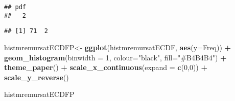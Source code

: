 \documentclass[
]{article}
\newenvironment{Shaded}{\begin{snugshade}}{\end{snugshade}}
\newcommand{\AttributeTok}[1]{\textcolor[rgb]{0.13,0.29,0.53}{#1}}
\newcommand{\DecValTok}[1]{\textcolor[rgb]{0.00,0.00,0.81}{#1}}
\newcommand{\FunctionTok}[1]{\textcolor[rgb]{0.13,0.29,0.53}{\textbf{#1}}}
\newcommand{\NormalTok}[1]{#1}
\newcommand{\OtherTok}[1]{\textcolor[rgb]{0.56,0.35,0.01}{#1}}
\newcommand{\SpecialCharTok}[1]{\textcolor[rgb]{0.81,0.36,0.00}{\textbf{#1}}}
\newcommand{\StringTok}[1]{\textcolor[rgb]{0.31,0.60,0.02}{#1}}
\begin{document}
\begin{verbatim}
## pdf 
##   2
\end{verbatim}

\begin{Shaded}
\end{Shaded}

\begin{verbatim}
## [1] 71  2
\end{verbatim}

\begin{Shaded}
\begin{Highlighting}[]
\NormalTok{histmremursatECDFP}\OtherTok{\textless{}{-}} \FunctionTok{ggplot}\NormalTok{(histmremursatECDF, }\FunctionTok{aes}\NormalTok{(}\AttributeTok{y=}\NormalTok{Freq)) }\SpecialCharTok{+} 
  \FunctionTok{geom\_histogram}\NormalTok{(}\AttributeTok{binwidth =} \DecValTok{1}\NormalTok{, }\AttributeTok{colour=}\StringTok{"black"}\NormalTok{, }\AttributeTok{fill=}\StringTok{"\#B4B4B4"}\NormalTok{) }\SpecialCharTok{+}
  \FunctionTok{theme\_paper}\NormalTok{() }\SpecialCharTok{+}
  \FunctionTok{scale\_x\_continuous}\NormalTok{(}\AttributeTok{expand =} \FunctionTok{c}\NormalTok{(}\DecValTok{0}\NormalTok{,}\DecValTok{0}\NormalTok{)) }\SpecialCharTok{+}
  \FunctionTok{scale\_y\_reverse}\NormalTok{()}

\NormalTok{histmremursatECDFP}
\end{Highlighting}
\end{Shaded}
\end{document}
